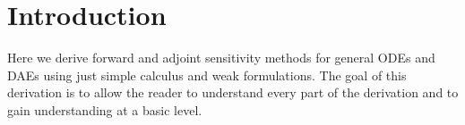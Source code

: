 \documentclass[pdf,ps2pdf,11pt]{SANDreport}
\begin{document}


%
\setcounter{secnumdepth}{3}
\SANDmain %

%
\section{Introduction}
%

Here we derive forward and adjoint sensitivity methods for general ODEs and
DAEs using just simple calculus and weak formulations.  The goal of this
derivation is to allow the reader to understand every part of the derivation
and to gain understanding at a basic level.
\end{document}
